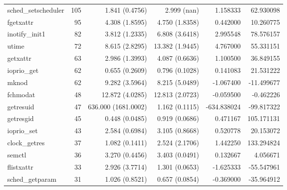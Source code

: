 \begin{longtable}{>{\ttfamily}lrrrrr}
            sched\_setscheduler &        105 &           1.841 (0.4756) &              2.999 (nan) &        1.158333 &    62.930098 \\
                      fgetxattr &         95 &           4.308 (1.8595) &           4.750 (1.8358) &        0.442000 &    10.260775 \\
                 inotify\_init1 &         82 &           3.812 (1.2335) &           6.808 (3.6418) &        2.995548 &    78.576157 \\
                          utime &         72 &           8.615 (2.8295) &          13.382 (1.9445) &        4.767000 &    55.331151 \\
                       getxattr &         63 &           2.986 (1.3993) &           4.087 (0.6636) &        1.100500 &    36.849155 \\
                    ioprio\_get &         62 &           0.655 (0.2609) &           0.796 (0.1028) &        0.141083 &    21.531222 \\
                          mknod &         62 &           9.282 (3.5964) &           8.215 (5.0489) &       -1.067400 &   -11.499677 \\
                       fchmodat &         48 &          12.872 (4.0285) &          12.813 (2.0723) &       -0.059500 &    -0.462226 \\
                      getresuid &         47 &      636.000 (1681.0002) &           1.162 (0.1115) &     -634.838024 &   -99.817322 \\
                      getresgid &         45 &           0.448 (0.0485) &           0.919 (0.0686) &        0.471167 &   105.171131 \\
                    ioprio\_set &         43 &           2.584 (0.6984) &           3.105 (0.8668) &        0.520778 &    20.153072 \\
                  clock\_getres &         37 &           1.082 (0.1411) &           2.524 (2.1706) &        1.442250 &   133.294824 \\
                         semctl &         36 &           3.270 (0.4456) &           3.403 (0.0491) &        0.132667 &     4.056671 \\
                     flistxattr &         33 &           2.926 (3.7714) &           1.301 (0.0653) &       -1.625333 &   -55.547961 \\
                sched\_getparam &         31 &           1.026 (0.8521) &           0.657 (0.0854) &       -0.369000 &   -35.964912 \\

\end{longtable}
